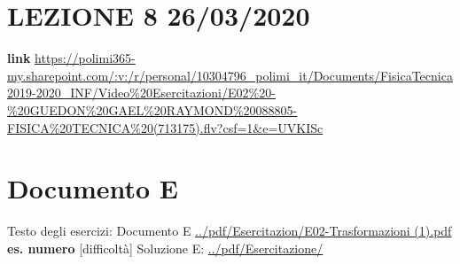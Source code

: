 \section*{LEZIONE 8 26/03/2020}
\textbf{link} \url{https://polimi365-my.sharepoint.com/:v:/r/personal/10304796_polimi_it/Documents/FisicaTecnica2019-2020_INF/Video%20Esercitazioni/E02%20-%20GUEDON%20GAEL%20RAYMOND%20088805-FISICA%20TECNICA%20(713175).flv?csf=1&e=UVKISc}
\section*{Documento E}
Testo degli esercizi:\newline
Documento E \url{../pdf/Esercitazion/E02-Trasformazioni (1).pdf}\newline
\newline
\textbf{es. numero} [difficoltà]\newline
Soluzione E: \url{../pdf/Esercitazione/}